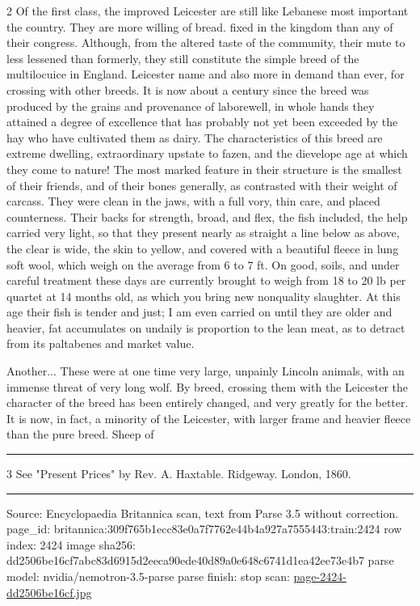 \documentclass[10pt]{article}
\begin{document}
\begin{multicols}{2}
Of the first class, the improved Leicester are still like Lebanese most important the country. They are more willing of bread. fixed in the kingdom than any of their congress. Although, from the altered taste of the community, their mute to less lessened than formerly, they still constitute the simple breed of the multilocuice in England. Leicester name and also more in demand than ever, for crossing with other breeds. It is now about a century since the breed was produced by the grains and provenance of laborewell, in whole hands they attained a degree of excellence that has probably not yet been exceeded by the hay who have cultivated them as dairy. The characteristics of this breed are extreme dwelling, extraordinary upstate to fazen, and the dievelope age at which they come to nature! The most marked feature in their structure is the smallest of their friends, and of their bones generally, as contrasted with their weight of carcass. They were clean in the jaws, with a full vory, thin care, and placed counterness. Their backs for strength, broad, and flex, the fish included, the help carried very light, so that they present nearly as straight a line below as above, the clear is wide, the skin to yellow, and covered with a beautiful fleece in lung soft wool, which weigh on the average from 6 to 7 ft. On good, soils, and under careful treatment these days are currently brought to weigh from 18 to 20 lb per quartet at 14 months old, as which you bring new nonquality slaughter. At this age their fish is tender and just; I am even carried on until they are older and heavier, fat accumulates on undaily is proportion to the lean meat, as to detract from its paltabenes and market value.

Another... These were at one time very large, unpainly Lincoln animals, with an immense threat of very long wolf. By breed, crossing them with the Leicester the character of the breed has been entirely changed, and very greatly for the better. It is now, in fact, a minority of the Leicester, with larger frame and heavier fleece than the pure breed. Sheep of

\end{multicols}
\par\vspace{4pt}\noindent\rule{0.3\linewidth}{0.4pt}\par
{\footnotesize
3 See "Present Prices" by Rev. A. Haxtable. Ridgeway. London, 1860.\par}
\vfill\par\noindent\rule{\linewidth}{0.4pt}\par
{\scriptsize\color{gray}\noindent Source: Encyclopaedia Britannica scan, text from Parse 3.5 without correction. page\_id: britannica:309f765b1ecc83e0a7f7762e44b4a927a7555443:train:2424 \quad row index: 2424 \quad image sha256: dd2506be16cf7abc83d6915d2eeca90ede40d89a0e648c6741d1ea42ee73e4b7 \quad parse model: nvidia/nemotron-3.5-parse \quad parse finish: stop \quad scan: \href{../scans/page-2424-dd2506be16cf.jpg}{page-2424-dd2506be16cf.jpg}\par}
\end{document}
